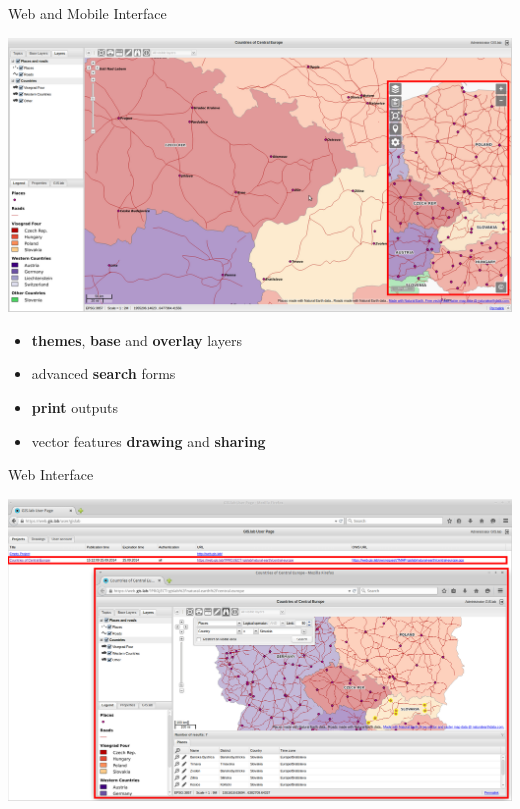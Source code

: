 \documentclass[12pt]{beamer}
\begin{document}
\begin{frame}{Web and Mobile Interface}
	\begin{center}
		\includegraphics[keepaspectratio=true,height=0.5\textheight]{images/gislab-web+mobile.png}
	\end{center}
	\begin{itemize}
		\item \textbf{themes}, \textbf{base} and \textbf{overlay} layers
		\item advanced \textbf{search} forms
		\item \textbf{print} outputs
		\item vector features \textbf{drawing} and \textbf{sharing}
	\end{itemize}
\end{frame}

\begin{frame}[plain]{Web Interface}
	\begin{center}
		\includegraphics[keepaspectratio=true,width=\textwidth]{images/gislab-web-2.png}
	\end{center}
\end{frame}
\end{document}
